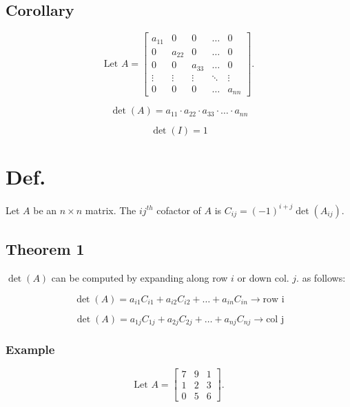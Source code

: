 \documentclass[12pt]{article}
\begin{document}
\subsection*{Corollary}

\[
  \text{Let } A = \begin{bmatrix}
    a_{11} & 0 & 0 & \dots & 0 \\
    0 & a_{22} & 0 & \dots & 0 \\
    0 & 0 & a_{33} & \dots & 0 \\
    \vdots & \vdots & \vdots & \ddots & \vdots \\
    0 & 0 & 0 & \dots & a_{nn}
  \end{bmatrix}
.\]

\begin{equation*}
  \det(A) = a_{11} \cdot a_{22} \cdot a_{33} \cdot \dots \cdot a_{nn}
\end{equation*}

\begin{equation*}
  \det(I) = 1
\end{equation*}

\section*{Def.}

Let $A$ be an $n \times n$ matrix. The $ij^{th}$ cofactor of $A$ is 
$C_{ij} = (-1)^{i+j} \det(A_{ij})$.

\subsection*{Theorem 1}

$\det(A)$ can be computed by expanding along row $i$ or down col. $j$. as follows:

\begin{equation*}
  \det(A) = a_{i1} C_{i1} + a_{i2} C_{i2} + \dots + a_{in} C_{in} \to \text{row i}
\end{equation*}

\begin{equation*}
  \det(A) = a_{1j} C_{1j} + a_{2j} C_{2j} + \dots + a_{nj} C_{nj} \to \text{col j}
\end{equation*}

\subsubsection*{Example}

\[
  \text{Let } A = \begin{bmatrix}
    7 & 9 & 1\\
    1 & 2 & 3 \\
    0 & 5 & 6
  \end{bmatrix}
.\]
\end{document}
